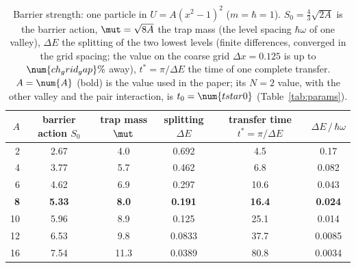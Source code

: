 \begin{table}[ht]
\centering
\small
\caption{Barrier strength: one particle in $U=A(x^2-1)^2$ ($m=\hbar=1$). $S_0=\frac43\sqrt{2A}$ is the barrier action, $\mut=\sqrt{8A}$ the trap mass (the level spacing $\hbar\omega$ of one valley), $\Delta E$ the splitting of the two lowest levels (finite differences, converged in the grid spacing; the value on the coarse grid $\Delta x=0.125$ is up to $\num{ch_grid_gap}\%$ away), $t^*=\pi/\Delta E$ the time of one complete transfer. $A=\num{A}$ (bold) is the value used in the paper; its $N=2$ value, with the other valley and the pair interaction, is $t_0=\num{tstar0}$ (Table~\ref{tab:params}).}
\label{tab:Asweep}
\begin{tabular}{rccccc}
\toprule
$A$ & barrier action $S_0$ & trap mass $\mut$ & splitting $\Delta E$ & transfer time $t^*=\pi/\Delta E$ & $\Delta E\,/\,\hbar\omega$ \\
\midrule
2 & 2.67 & 4.0 & 0.692 & 4.5 & 0.17 \\
4 & 3.77 & 5.7 & 0.462 & 6.8 & 0.082 \\
6 & 4.62 & 6.9 & 0.297 & 10.6 & 0.043 \\
\textbf{8} & \textbf{5.33} & \textbf{8.0} & \textbf{0.191} & \textbf{16.4} & \textbf{0.024} \\
10 & 5.96 & 8.9 & 0.125 & 25.1 & 0.014 \\
12 & 6.53 & 9.8 & 0.0833 & 37.7 & 0.0085 \\
16 & 7.54 & 11.3 & 0.0389 & 80.8 & 0.0034 \\
\bottomrule
\end{tabular}
\end{table}
